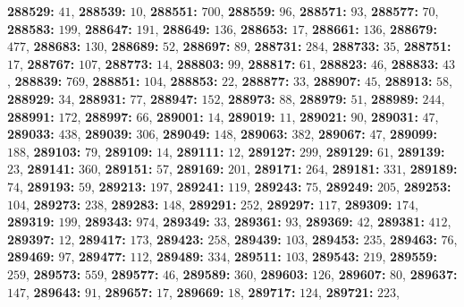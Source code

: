 \textsf{\bfseries 288529:} $41$, \textsf{\bfseries 288539:} $10$, \textsf{\bfseries 288551:} $700$, \textsf{\bfseries 288559:} $96$, \textsf{\bfseries 288571:} $93$, \textsf{\bfseries 288577:} $70$, \textsf{\bfseries 288583:} $199$, \textsf{\bfseries 288647:} $191$, \textsf{\bfseries 288649:} $136$, \textsf{\bfseries 288653:} $17$, \textsf{\bfseries 288661:} $136$, \textsf{\bfseries 288679:} $477$, \textsf{\bfseries 288683:} $130$, \textsf{\bfseries 288689:} $52$, \textsf{\bfseries 288697:} $89$, \textsf{\bfseries 288731:} $284$, \textsf{\bfseries 288733:} $35$, \textsf{\bfseries 288751:} $17$, \textsf{\bfseries 288767:} $107$, \textsf{\bfseries 288773:} $14$, \textsf{\bfseries 288803:} $99$, \textsf{\bfseries 288817:} $61$, \textsf{\bfseries 288823:} $46$, \textsf{\bfseries 288833:} $43$, \textsf{\bfseries 288839:} $769$, \textsf{\bfseries 288851:} $104$, \textsf{\bfseries 288853:} $22$, \textsf{\bfseries 288877:} $33$, \textsf{\bfseries 288907:} $45$, \textsf{\bfseries 288913:} $58$, \textsf{\bfseries 288929:} $34$, \textsf{\bfseries 288931:} $77$, \textsf{\bfseries 288947:} $152$, \textsf{\bfseries 288973:} $88$, \textsf{\bfseries 288979:} $51$, \textsf{\bfseries 288989:} $244$, \textsf{\bfseries 288991:} $172$, \textsf{\bfseries 288997:} $66$, \textsf{\bfseries 289001:} $14$, \textsf{\bfseries 289019:} $11$, \textsf{\bfseries 289021:} $90$, \textsf{\bfseries 289031:} $47$, \textsf{\bfseries 289033:} $438$, \textsf{\bfseries 289039:} $306$, \textsf{\bfseries 289049:} $148$, \textsf{\bfseries 289063:} $382$, \textsf{\bfseries 289067:} $47$, \textsf{\bfseries 289099:} $188$, \textsf{\bfseries 289103:} $79$, \textsf{\bfseries 289109:} $14$, \textsf{\bfseries 289111:} $12$, \textsf{\bfseries 289127:} $299$, \textsf{\bfseries 289129:} $61$, \textsf{\bfseries 289139:} $23$, \textsf{\bfseries 289141:} $360$, \textsf{\bfseries 289151:} $57$, \textsf{\bfseries 289169:} $201$, \textsf{\bfseries 289171:} $264$, \textsf{\bfseries 289181:} $331$, \textsf{\bfseries 289189:} $74$, \textsf{\bfseries 289193:} $59$, \textsf{\bfseries 289213:} $197$, \textsf{\bfseries 289241:} $119$, \textsf{\bfseries 289243:} $75$, \textsf{\bfseries 289249:} $205$, \textsf{\bfseries 289253:} $104$, \textsf{\bfseries 289273:} $238$, \textsf{\bfseries 289283:} $148$, \textsf{\bfseries 289291:} $252$, \textsf{\bfseries 289297:} $117$, \textsf{\bfseries 289309:} $174$, \textsf{\bfseries 289319:} $199$, \textsf{\bfseries 289343:} $974$, \textsf{\bfseries 289349:} $33$, \textsf{\bfseries 289361:} $93$, \textsf{\bfseries 289369:} $42$, \textsf{\bfseries 289381:} $412$, \textsf{\bfseries 289397:} $12$, \textsf{\bfseries 289417:} $173$, \textsf{\bfseries 289423:} $258$, \textsf{\bfseries 289439:} $103$, \textsf{\bfseries 289453:} $235$, \textsf{\bfseries 289463:} $76$, \textsf{\bfseries 289469:} $97$, \textsf{\bfseries 289477:} $112$, \textsf{\bfseries 289489:} $334$, \textsf{\bfseries 289511:} $103$, \textsf{\bfseries 289543:} $219$, \textsf{\bfseries 289559:} $259$, \textsf{\bfseries 289573:} $559$, \textsf{\bfseries 289577:} $46$, \textsf{\bfseries 289589:} $360$, \textsf{\bfseries 289603:} $126$, \textsf{\bfseries 289607:} $80$, \textsf{\bfseries 289637:} $147$, \textsf{\bfseries 289643:} $91$, \textsf{\bfseries 289657:} $17$, \textsf{\bfseries 289669:} $18$, \textsf{\bfseries 289717:} $124$, \textsf{\bfseries 289721:} $223$, 
